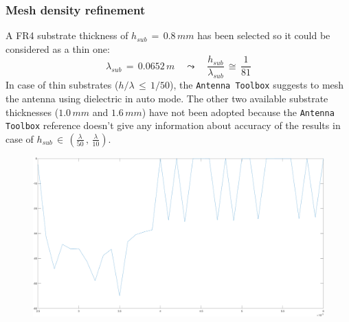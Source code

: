 \documentclass[12pt,a4paper]{book}
\begin{document}
{\subsubsection*{\selectfont\color{Turquoise}Mesh density refinement}
A FR4 substrate thickness of $h_{sub}\,=\,0.8\,mm$  has been selected so it could be considered as a thin one:
\[\lambda_{sub}\,=\,0.0652\,m\quad \leadsto\quad \frac{h_{sub}}{\lambda_{sub}}\,\cong\,\frac{1}{81}\]
In case of thin substrates ($h/\lambda\,\leq\,1/50$),  the \texttt{\color{Mahogany}Antenna Toolbox} suggests to mesh the antenna using dielectric in auto mode. The other two available substrate thicknesses ($1.0\,mm$ and $1.6\,mm$) have not been adopted because the \texttt{\color{Mahogany}Antenna Toolbox} reference doesn't give any information about accuracy of the results in case of $h_{sub}\,\in\,\left(\frac{\lambda}{50}\,,\,\frac{\lambda}{10}\right)$. 
\begin{center}
\begin{figure}[h]
\includegraphics[scale=0.3]{mesh_levels.png}
\end{figure}
\end{center}
}
\end{document}
